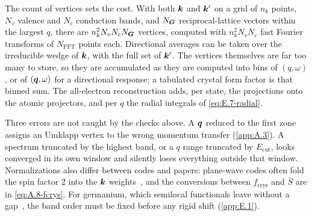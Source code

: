 The count of vertices sets the cost. With both $\bm{k}$ and $\bm{k}'$ on a grid of $n_k$ points, $N_v$ valence and $N_c$ conduction bands, and $N_{\bm{G}}$ reciprocal-lattice vectors within the largest $q$, there are $n_k^2N_vN_cN_{\bm{G}}$ vertices, computed with $n_k^2N_vN_c$ fast Fourier transforms of $N_{\mathrm{FFT}}$ points each. Directional averages can be taken over the irreducible wedge of $\bm{k}$, with the full set of $\bm{k}'$. The vertices themselves are far too many to store, so they are accumulated as they are computed into bins of $(q,\omega)$, or of $(\bm{q},\omega)$ for a directional response; a tabulated crystal form factor is that binned sum. The all-electron reconstruction adds, per state, the projections onto the atomic projectors, and per $q$ the radial integrals of \cref{eq:E.7-radial}.

Three errors are not caught by the checks above. A $\bm{q}$ reduced to the first zone assigns an Umklapp vertex to the wrong momentum transfer (\cref{app:A.3}). A spectrum truncated by the highest band, or a $q$ range truncated by $E_{\mathrm{cut}}$, looks converged in its own window and silently loses everything outside that window. Normalizations also differ between codes and papers: plane-wave codes often fold the spin factor 2 into the $\bm{k}$ weights~\cite[Eq.~(4.2)]{essig2016direct}, and the conversions between $f_{\mathrm{crys}}$ and $\bar S$ are in \cref{eq:A.8-fcrys}. For germanium, which semilocal functionals leave without a gap~\cite[Sect.~2.1]{griffin2021extended}, the band order must be fixed before any rigid shift (\cref{app:E.1}).

